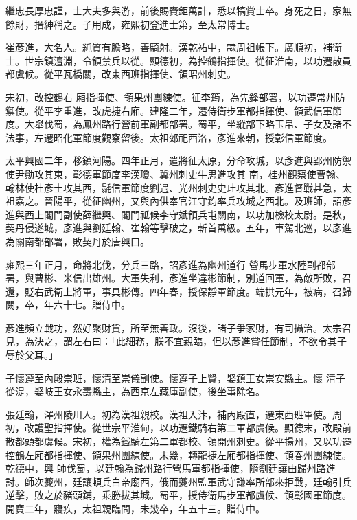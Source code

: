 \begin{pinyinscope}
 繼忠長厚忠謹，士大夫多與游，前後賜賚鉅萬計，悉以犒賞士卒。身死之日，家無餘財，搢紳稱之。子用成，雍熙初登進士第，至太常博士。



 崔彥進，大名人。純質有膽略，善騎射。漢乾祐中，隸周祖帳下。廣順初，補衛士。世宗鎮澶淵，令領禁兵以從。顯德初，為控鶴指揮使。從征淮南，以功遷散員都虞候。從平瓦橋關，改東西班指揮使、領昭州刺史。



 宋初，改控鶴右
 廂指揮使、領果州團練使。征李筠，為先鋒部署，以功遷常州防禦使。從平李重進，改虎捷右廂。建隆二年，遷侍衛步軍都指揮使、領武信軍節度。大舉伐蜀，為鳳州路行營前軍副都部署。蜀平，坐縱部下略玉帛、子女及諸不法事，左遷昭化軍節度觀察留後。太祖郊祀西洛，彥進來朝，授彰信軍節度。



 太平興國二年，移鎮河陽。四年正月，遣將征太原，分命攻城，以彥進與郢州防禦使尹勛攻其東，彰德軍節度李漢瓊、冀州刺史牛思進攻其
 南，桂州觀察使曹翰、翰林使杜彥圭攻其西，毾信軍節度劉遇、光州刺史史珪攻其北。彥進督戰甚急，太祖嘉之。晉陽平，從征幽州，又與內供奉官江守鈞率兵攻城之西北。及班師，詔彥進與西上閣門副使薛繼興、閣門祗候李守斌領兵屯關南，以功加檢校太尉。是秋，契丹侵遂城，彥進與劉廷翰、崔翰等擊破之，斬首萬級。五年，車駕北巡，以彥進為關南都部署，敗契丹於唐興口。



 雍熙三年正月，命將北伐，分兵三路，詔彥進為幽州道行
 營馬步軍水陸副都部署，與曹彬、米信出雄州。大軍失利，彥進坐違彬節制，別道回軍，為敵所敗，召還，貶右武衛上將軍，事具彬傳。四年春，授保靜軍節度。端拱元年，被病，召歸闕，卒，年六十七。贈侍中。



 彥進頻立戰功，然好聚財貨，所至無善政。沒後，諸子爭家財，有司攝治。太宗召見，為決之，謂左右曰：「此細務，朕不宜親臨，但以彥進嘗任節制，不欲令其子辱於父耳。」



 子懷遵至內殿崇班，懷清至崇儀副使。懷遵子上賢，娶鎮王女崇安縣主。懷
 清子從湜，娶岐王女永壽縣主，為西京左藏庫副使，後坐事除名。



 張廷翰，澤州陵川人。初為漢祖親校。漢祖入汴，補內殿直，遷東西班軍使。周初，改護聖指揮使。從世宗平淮甸，以功遷鐵騎右第二軍都虞候。顯德末，改殿前散都頭都虞候。宋初，權為鐵騎左第二軍都校、領開州刺史。從平揚州，又以功遷控鶴左廂都指揮使、領果州團練使。未幾，轉龍捷左廂都指揮使、領春州團練使。乾德中，興
 師伐蜀，以廷翰為歸州路行營馬軍都指揮使，隨劉廷讓由歸州路進討。師次夔州，廷讓頓兵白帝廟西，俄而夔州監軍武守謙率所部來拒戰，廷翰引兵逆擊，敗之於豬頭鋪，乘勝拔其城。蜀平，授侍衛馬步軍都虞候、領彰國軍節度。開寶二年，寢疾，太祖親臨問，未幾卒，年五十三。贈侍中。




\end{pinyinscope}

